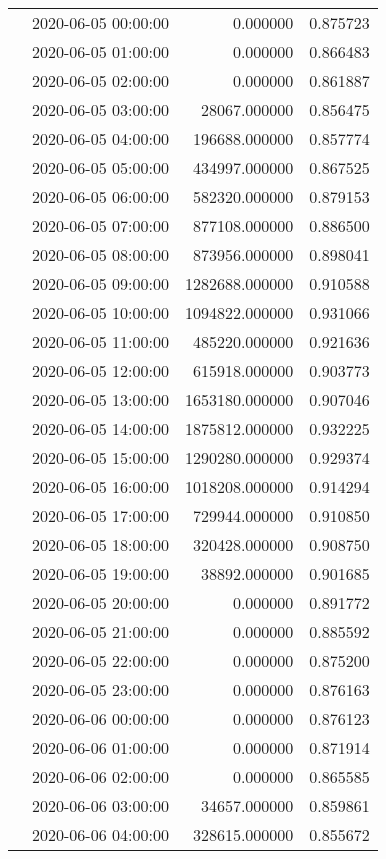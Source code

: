 \begin{tabular}{llrr}
 & 2020-06-05 00:00:00 & 0.000000 & 0.875723 \\
 & 2020-06-05 01:00:00 & 0.000000 & 0.866483 \\
 & 2020-06-05 02:00:00 & 0.000000 & 0.861887 \\
 & 2020-06-05 03:00:00 & 28067.000000 & 0.856475 \\
 & 2020-06-05 04:00:00 & 196688.000000 & 0.857774 \\
 & 2020-06-05 05:00:00 & 434997.000000 & 0.867525 \\
 & 2020-06-05 06:00:00 & 582320.000000 & 0.879153 \\
 & 2020-06-05 07:00:00 & 877108.000000 & 0.886500 \\
 & 2020-06-05 08:00:00 & 873956.000000 & 0.898041 \\
 & 2020-06-05 09:00:00 & 1282688.000000 & 0.910588 \\
 & 2020-06-05 10:00:00 & 1094822.000000 & 0.931066 \\
 & 2020-06-05 11:00:00 & 485220.000000 & 0.921636 \\
 & 2020-06-05 12:00:00 & 615918.000000 & 0.903773 \\
 & 2020-06-05 13:00:00 & 1653180.000000 & 0.907046 \\
 & 2020-06-05 14:00:00 & 1875812.000000 & 0.932225 \\
 & 2020-06-05 15:00:00 & 1290280.000000 & 0.929374 \\
 & 2020-06-05 16:00:00 & 1018208.000000 & 0.914294 \\
 & 2020-06-05 17:00:00 & 729944.000000 & 0.910850 \\
 & 2020-06-05 18:00:00 & 320428.000000 & 0.908750 \\
 & 2020-06-05 19:00:00 & 38892.000000 & 0.901685 \\
 & 2020-06-05 20:00:00 & 0.000000 & 0.891772 \\
 & 2020-06-05 21:00:00 & 0.000000 & 0.885592 \\
 & 2020-06-05 22:00:00 & 0.000000 & 0.875200 \\
 & 2020-06-05 23:00:00 & 0.000000 & 0.876163 \\
 & 2020-06-06 00:00:00 & 0.000000 & 0.876123 \\
 & 2020-06-06 01:00:00 & 0.000000 & 0.871914 \\
 & 2020-06-06 02:00:00 & 0.000000 & 0.865585 \\
 & 2020-06-06 03:00:00 & 34657.000000 & 0.859861 \\
 & 2020-06-06 04:00:00 & 328615.000000 & 0.855672 \\

\end{tabular}
